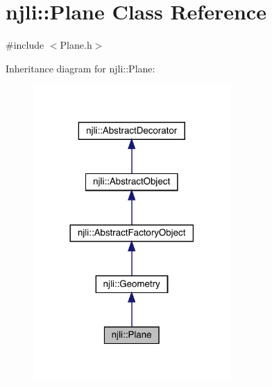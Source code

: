 \hypertarget{classnjli_1_1_plane}{}\section{njli\+:\+:Plane Class Reference}
\label{classnjli_1_1_plane}


{\ttfamily \#include $<$Plane.\+h$>$}



Inheritance diagram for njli\+:\+:Plane\+:\nopagebreak
\begin{figure}[H]
\begin{center}
\leavevmode
\includegraphics[width=213pt]{classnjli_1_1_plane__inherit__graph}
\end{center}
\end{figure}


